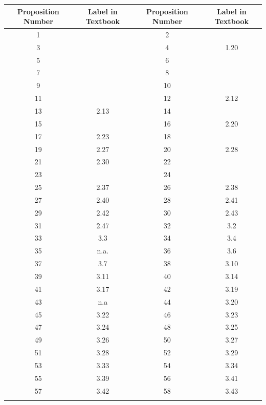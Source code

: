 \documentclass{book}
\newenvironment{allowTableDashes}{\ADLactivate}{\ADLinactivate}
\newcommand{\myVS}{\vphantom{$\int_a^b$}}
\begin{document}
   \begin{allowTableDashes}
      \begin{tabular}{ c|c||c|c }
         Proposition Number & Label in Textbook & Proposition Number & Label in Textbook \\ \hline
         \myVS 1 &  & 2 &  \\ \hdashline[10pt/3pt]
         \myVS 3 &  & 4 & 1.20 \\ \hdashline[10pt/3pt]
         \myVS 5 &  & 6 &  \\ \hdashline[10pt/3pt]
         \myVS 7 &  & 8 &  \\ \hdashline[10pt/3pt]
         \myVS 9 &  & 10 &  \\ \hdashline[10pt/3pt]
         \myVS 11 &  & 12 & 2.12 \\ \hdashline[10pt/3pt]
         \myVS 13 & 2.13 & 14 &  \\ \hdashline[10pt/3pt]
         \myVS 15 &  & 16 & 2.20 \\ \hdashline[10pt/3pt]
         \myVS 17 & 2.23 & 18 &  \\ \hdashline[10pt/3pt]
         \myVS 19 & 2.27 & 20 & 2.28 \\ \hdashline[10pt/3pt]
         \myVS 21 & 2.30 & 22 &  \\ \hdashline[10pt/3pt]
         \myVS 23 &  & 24 &  \\ \hdashline[10pt/3pt]
         \myVS 25 & 2.37 & 26 & 2.38 \\ \hdashline[10pt/3pt]
         \myVS 27 & 2.40 & 28 & 2.41 \\ \hdashline[10pt/3pt]
         \myVS 29 & 2.42 & 30 & 2.43 \\ \hdashline[10pt/3pt]
         \myVS 31 & 2.47 & 32 & 3.2\phantom{0} \\ \hdashline[10pt/3pt]
         \myVS 33 & 3.3\phantom{0}  & 34 & 3.4\phantom{0} \\ \hdashline[10pt/3pt]
         \myVS 35 & n.a. & 36 & 3.6\phantom{0} \\ \hdashline[10pt/3pt]
         \myVS 37 & 3.7 & 38 & 3.10  \\ \hdashline[10pt/3pt]
         \myVS 39 & 3.11 & 40 & 3.14 \\ \hdashline[10pt/3pt]
         \myVS 41 & 3.17 & 42 & 3.19 \\ \hdashline[10pt/3pt]
         \myVS 43 & n.a & 44 & 3.20 \\ \hdashline[10pt/3pt]
         \myVS 45 & 3.22 & 46 & 3.23 \\ \hdashline[10pt/3pt]
         \myVS 47 & 3.24 & 48 & 3.25 \\ \hdashline[10pt/3pt]
         \myVS 49 & 3.26 & 50 & 3.27 \\ \hdashline[10pt/3pt]
         \myVS 51 & 3.28  & 52 & 3.29 \\ \hdashline[10pt/3pt]
         \myVS 53 & 3.33 & 54 & 3.34 \\ \hdashline[10pt/3pt]
         \myVS 55 & 3.39 & 56 & 3.41 \\ \hdashline[10pt/3pt]
         \myVS 57 & 3.42  & 58 & 3.43 \\ \hdashline[10pt/3pt]   
      \end{tabular}


\end{allowTableDashes}
\end{document}
